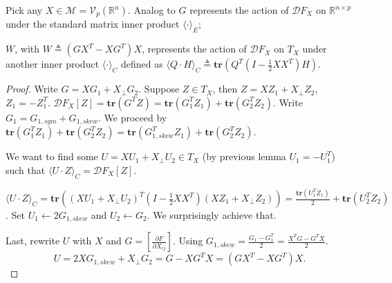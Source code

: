 \documentclass[aspectratio=43, 10pt]{beamer}
\begin{document}
  \begin{frame}{}
      \vspace{-0.1cm}
      \begin{theorem}
      Pick any $X \in \mathcal{M} = \mathcal{V}_p (\mathbb{R}^n)$.
      Analog to $G$ represents the action of $\mathcal{D}F_X$ on $\mathbb{R}^{n \times p}$ under the standard matrix inner product $\langle \cdot \rangle_E$; 
      
      $W$, with $W \triangleq (GX^T-XG^T)X$, represents the action of $\mathcal{D}F_X$ on $T_X$ under another inner product $\langle \cdot \rangle_C$ defined as $\langle Q \cdot H \rangle_C \triangleq \textbf{tr}(Q^T (I-\frac{1}{2}XX^T)H).$ 
  \end{theorem}
     \vspace{-0.2cm}
     \pause 
  \begin{proof}
      Write $G=XG_1 + X_{\perp} G_2$. Suppose $Z \in T_X$, then $Z = XZ_1 + X_{\perp} Z_2$, $Z_1=-Z_1^T.$
      $\mathcal{D}F_X[Z] = \textbf{tr}(G^T Z) = \textbf{tr}(G_1^T Z_1) + \textbf{tr}(G_2^T Z_2)$. Write $G_1=G_{1,sym} + G_{1,skew}$. 
      We proceed by $\textbf{tr}(G_1^T Z_1) + \textbf{tr}(G_2^T Z_2)=\textbf{tr}(G_{1,skew}^T Z_1) + \textbf{tr}(G_2^T Z_2)$. 

      \vspace{0.1cm}
      We want to find some $U = XU_1 + X_\perp U_2 \in T_X$ (by previous lemma $U_1=-U_1^T$) such that $\langle U \cdot Z \rangle_C = \mathcal{D}F_X[Z].$

      \vspace{0.1cm}
      $\langle U \cdot Z \rangle_C = \textbf{tr}((XU_1 + X_\perp U_2)^T (I-\frac{1}{2}XX^T) (XZ_1 + X_{\perp} Z_2)) = \frac{\textbf{tr}(U_1^T Z_1)}{2}+\textbf{tr}(U_2^T Z_2)$. Set $U_1 \gets 2 G_{1,skew}$ and $U_2 \gets G_2$. We surprisingly achieve that. 

      \vspace{0.1cm}
      Last, rewrite $U$ with $X$ and $G=[\frac{\partial F}{\partial X_{ij}}]$. Using $G_{1,skew}=\frac{G_1 - G_1^T}{2}=\frac{X^T G-G^T X}{2}$.
      \small 
      $$U =2 X G_{1,skew} + X_\perp G_2= G-XG^T X = (GX^T - XG^T)X. $$ \end{proof}
\end{frame} 
\end{document}
